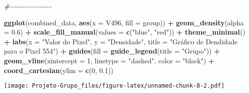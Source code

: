 \documentclass[
]{article}
\newenvironment{Shaded}{\begin{snugshade}}{\end{snugshade}}
\newcommand{\AttributeTok}[1]{\textcolor[rgb]{0.13,0.29,0.53}{#1}}
\newcommand{\CommentTok}[1]{\textcolor[rgb]{0.56,0.35,0.01}{\textit{#1}}}
\newcommand{\DecValTok}[1]{\textcolor[rgb]{0.00,0.00,0.81}{#1}}
\newcommand{\FloatTok}[1]{\textcolor[rgb]{0.00,0.00,0.81}{#1}}
\newcommand{\FunctionTok}[1]{\textcolor[rgb]{0.13,0.29,0.53}{\textbf{#1}}}
\newcommand{\NormalTok}[1]{#1}
\newcommand{\SpecialCharTok}[1]{\textcolor[rgb]{0.81,0.36,0.00}{\textbf{#1}}}
\newcommand{\StringTok}[1]{\textcolor[rgb]{0.31,0.60,0.02}{#1}}
\begin{document}
\begin{Shaded}
\begin{Highlighting}[]
\CommentTok{\#{-}{-}{-}{-}{-}{-}{-}{-}{-}{-}{-}{-}{-}{-}{-}{-}{-}}

\FunctionTok{ggplot}\NormalTok{(combined\_data, }\FunctionTok{aes}\NormalTok{(}\AttributeTok{x =}\NormalTok{ V496, }\AttributeTok{fill =}\NormalTok{ group)) }\SpecialCharTok{+}
  \FunctionTok{geom\_density}\NormalTok{(}\AttributeTok{alpha =} \FloatTok{0.6}\NormalTok{) }\SpecialCharTok{+}
  \FunctionTok{scale\_fill\_manual}\NormalTok{(}\AttributeTok{values =} \FunctionTok{c}\NormalTok{(}\StringTok{"blue"}\NormalTok{, }\StringTok{"red"}\NormalTok{)) }\SpecialCharTok{+}
  \FunctionTok{theme\_minimal}\NormalTok{() }\SpecialCharTok{+}
  \FunctionTok{labs}\NormalTok{(}\AttributeTok{x =} \StringTok{"Valor do Pixel"}\NormalTok{, }\AttributeTok{y =} \StringTok{"Densidade"}\NormalTok{, }\AttributeTok{title =} \StringTok{"Gráfico de Dendidade para o Pixel 554"}\NormalTok{) }\SpecialCharTok{+}
  \FunctionTok{guides}\NormalTok{(}\AttributeTok{fill =} \FunctionTok{guide\_legend}\NormalTok{(}\AttributeTok{title =} \StringTok{"Grupo"}\NormalTok{)) }\SpecialCharTok{+} 
  \FunctionTok{geom\_vline}\NormalTok{(}\AttributeTok{xintercept =} \DecValTok{1}\NormalTok{, }\AttributeTok{linetype =} \StringTok{"dashed"}\NormalTok{, }\AttributeTok{color =} \StringTok{"black"}\NormalTok{) }\SpecialCharTok{+}
  \FunctionTok{coord\_cartesian}\NormalTok{(}\AttributeTok{ylim =} \FunctionTok{c}\NormalTok{(}\DecValTok{0}\NormalTok{, }\FloatTok{0.1}\NormalTok{))}
\end{Highlighting}
\end{Shaded}

\texttt{[image: Projeto-Grupo\_files/figure-latex/unnamed-chunk-8-2.pdf]}
\end{document}
